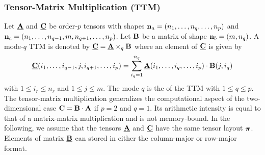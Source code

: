 \subsubsection{Tensor-Matrix Multiplication (TTM)}
Let $\underline{\mathbf{A}}$ and $\underline{\mathbf{C}}$ be order-$p$ tensors with shapes $\mathbf{n}_a = (n_1,\dots,n_q,\dots,n_p)$ and $\mathbf{n}_c =(n_1,\dots,n_{q-1},m,n_{q+1},\dots,n_p)$. 
Let $\mathbf{B}$ be a matrix of shape $\mathbf{n}_b = (m,n_q)$.
A mode-$q$ TTM is denoted by $\underline{\mathbf{C}} = \underline{\mathbf{A}} \times_q \mathbf{B}$ where an element of $\underline{\mathbf{C}}$ is given by
\begin{equation}
\label{equ:tensor.matrix.multplication}
\underline{\mathbf{C}}(i_1, \dots, i_{q-1}, j, i_{q+1}, \dots, i_p) = \sum_{i_q=1}^{n_q} \underline{\mathbf{A}}(i_1, \dots, i_q, \dots, i_p) \cdot \mathbf{B}(j,i_q)
\end{equation}
with $1 \leq i_r \leq n_r$ and $1 \leq j \leq m$.
The mode $q$ is the   of the TTM  with $1 \leq q \leq p$.
The tensor-matrix multiplication generalizes the computational aspect of the two-dimensional case $\mathbf{C} = \mathbf{B} \cdot \mathbf{A}$ if $p=2$ and $q=1$.
Its arithmetic intensity is equal to that of a matrix-matrix multiplication and is not memory-bound.
In the following, we assume that the tensors $\underline{\mathbf{A}}$ and $\underline{\mathbf{C}}$ have the same tensor layout $\boldsymbol{\pi}$. 
Elements of matrix $\underline{\mathbf{B}}$ can stored in either the column-major or row-major format.

